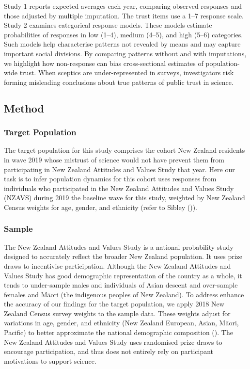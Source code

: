 \documentclass[
  single column]{article}
\begin{document}
Study 1 reports expected averages each year, comparing observed
responses and those adjusted by multiple imputation. The trust items use
a 1--7 response scale. Study 2 examines categorical response models.
These models estimate probabilities of responses in low (1--4), medium
(4--5), and high (5--6) categories. Such models help characterise
patterns not revealed by means and may capture important social
divisions. By comparing patterns without and with imputations, we
highlight how non-response can bias cross-sectional estimates of
population-wide trust. When sceptics are under-represented in surveys,
investigators risk forming misleading conclusions about true patterns of
public trust in science.

\subsection{Method}\label{method}

\subsubsection{Target Population}\label{target-population}

The target population for this study comprises the cohort New Zealand
residents in wave 2019 whose mistrust of science would not have prevent
them from participating in New Zealand Attitudes and Values Study that
year. Here our task is to infer population dynamics for this cohort uses
responses from individuals who participated in the New Zealand Attitudes
and Values Study (NZAVS) during 2019 the baseline wave for this study,
weighted by New Zealand Census weights for age, gender, and ethnicity
(refer to Sibley ()).

\subsubsection{Sample}\label{sample}

The New Zealand Attitudes and Values Study is a national probability
study designed to accurately reflect the broader New Zealand population.
It uses prize draws to incentivise participation. Although the New
Zealand Attitudes and Values Study has good demographic representation
of the country as a whole, it tends to under-sample males and
individuals of Asian descent and over-sample females and Māori (the
indigenous peoples of New Zealand). To address enhance the accuracy of
our findings for the target population, we apply 2018 New Zealand Census
survey weights to the sample data. These weights adjust for variations
in age, gender, and ethnicity (New Zealand European, Asian, Māori,
Pacific) to better approximate the national demographic composition
(). The New Zealand Attitudes and
Values Study uses randomised prize draws to encourage participation, and
thus does not entirely rely on participant motivations to support
science.
\end{document}
